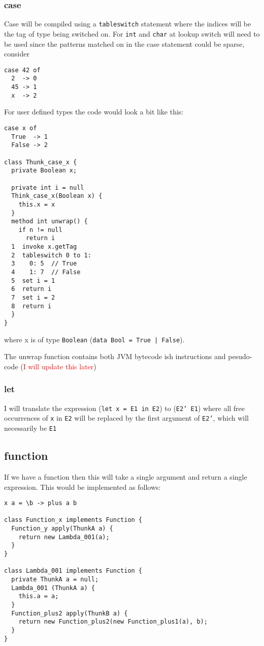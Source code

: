 \documentclass[12pt,a4paper,twoside]{article}
\begin{document}
\subsubsection{case}

Case will be compiled using a \texttt{tableswitch} statement where the indices will be the tag of type being switched on. For \texttt{int} and \texttt{char} at lookup 
switch will need to be used since the patterns matched on in the case statement could be sparse, consider

\begin{verbatim}
case 42 of
  2  -> 0
  45 -> 1
  x  -> 2
\end{verbatim}

For user defined types the code would look a bit like this:

\begin{verbatim}
case x of
  True  -> 1
  False -> 2

class Thunk_case_x {
  private Boolean x;

  private int i = null
  Think_case_x(Boolean x) {
    this.x = x
  }
  method int unwrap() {
    if n != null
      return i
  1  invoke x.getTag
  2  tableswitch 0 to 1:
  3    0: 5  // True
  4    1: 7  // False
  5  set i = 1
  6  return i
  7  set i = 2
  8  return i
  }
}
\end{verbatim}

where x is of type \texttt{Boolean} (\texttt{data Bool = True | False}).

The unwrap function contains both JVM bytecode ish instructions and pesudo-code (\textcolor{red}{I will update this later})

\subsubsection{let} 

I will translate the expression (\texttt{let x = E1 in E2}) to (\texttt{E2' E1}) where all free occurrences of \texttt{x} in \texttt{E2} will be replaced 
by the first argument of \texttt{E2'}, which will necessarily be \texttt{E1}

\subsection{function}

If we have a function then this will take a single argument and return a single expression. This would be implemented as follows:

\begin{verbatim}
x a = \b -> plus a b

class Function_x implements Function {
  Function_y apply(ThunkA a) {
    return new Lambda_001(a);
  }
}

class Lambda_001 implements Function {
  private ThunkA a = null;
  Lambda_001 (ThunkA a) {
    this.a = a;
  }
  Function_plus2 apply(ThunkB a) {
    return new Function_plus2(new Function_plus1(a), b);
  }
}
\end{verbatim}
\end{document}
